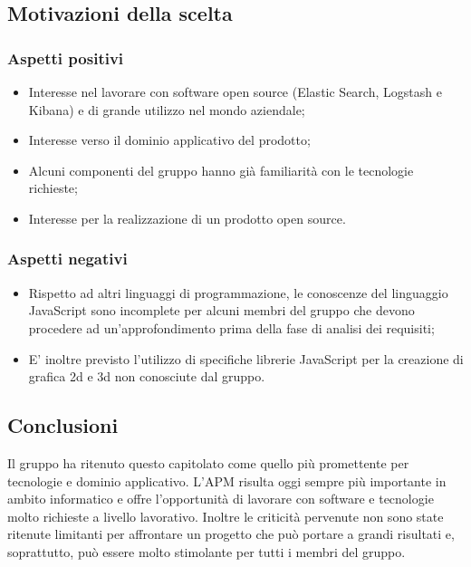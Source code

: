 	\subsection{Motivazioni della scelta}
		\subsubsection{Aspetti positivi}
			\begin{itemize}
				\item Interesse nel lavorare con software open source (Elastic Search, Logstash e Kibana) e di grande utilizzo nel mondo aziendale;
				\item Interesse verso il dominio applicativo del prodotto;
				\item Alcuni componenti del gruppo hanno già familiarità con le tecnologie richieste;
				\item Interesse per la realizzazione di un prodotto open source.
			\end{itemize}
		\subsubsection{Aspetti negativi}
			\begin{itemize}
				\item Rispetto ad altri linguaggi di programmazione, le conoscenze del linguaggio JavaScript sono incomplete per alcuni membri del gruppo che devono procedere ad un'approfondimento prima della fase di analisi dei requisiti;
				\item E' inoltre previsto l'utilizzo di specifiche librerie JavaScript per la creazione di grafica 2d e 3d non conosciute dal gruppo.
			\end{itemize}
	\subsection{Conclusioni}	
	Il gruppo ha ritenuto questo capitolato come quello più promettente per tecnologie e dominio applicativo. L'APM risulta oggi sempre più importante in ambito informatico e offre l'opportunità di lavorare con software e tecnologie molto richieste a livello lavorativo. Inoltre le criticità pervenute non sono state ritenute limitanti per affrontare un progetto che può portare a grandi risultati e, soprattutto, può essere molto stimolante per tutti i membri del gruppo.
			 